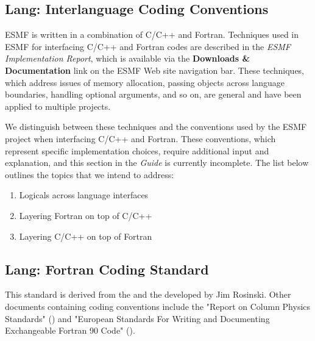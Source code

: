 
\subsection{Lang: Interlanguage Coding Conventions}

ESMF is written in a combination of C/C++ and Fortran.
Techniques used in ESMF for interfacing C/C++ and Fortran codes
are described in the {\it ESMF Implementation Report}\cite{bib:ESMFimplrep},
which is available via the {\bf Downloads \& Documentation} link 
on the ESMF Web site navigation bar.  These
techniques, which address issues of memory allocation, passing
objects across language boundaries, handling optional arguments,
and so on, are general and have been applied to multiple projects.  

We distinguish between these techniques and the conventions used
by the ESMF project when interfacing C/C++ and Fortran.  These
conventions, which represent specific implementation choices,
require additional input and explanation, and this section in 
the {\it Guide} is currently incomplete.  The list below outlines
the topics that we intend to address:

\begin{enumerate}
\item Logicals across language interfaces
\item Layering Fortran on top of C/C++
\item Layering C/C++ on top of Fortran
\end{enumerate}

\subsection{Lang: Fortran Coding Standard}
\label{sec:code_conv_cam}

This standard is derived from the  and the
developed by Jim Rosinski. Other documents containing coding
conventions include the "Report on Column Physics Standards"
()
and "European Standards For Writing and Documenting Exchangeable
Fortran 90 Code"
().

